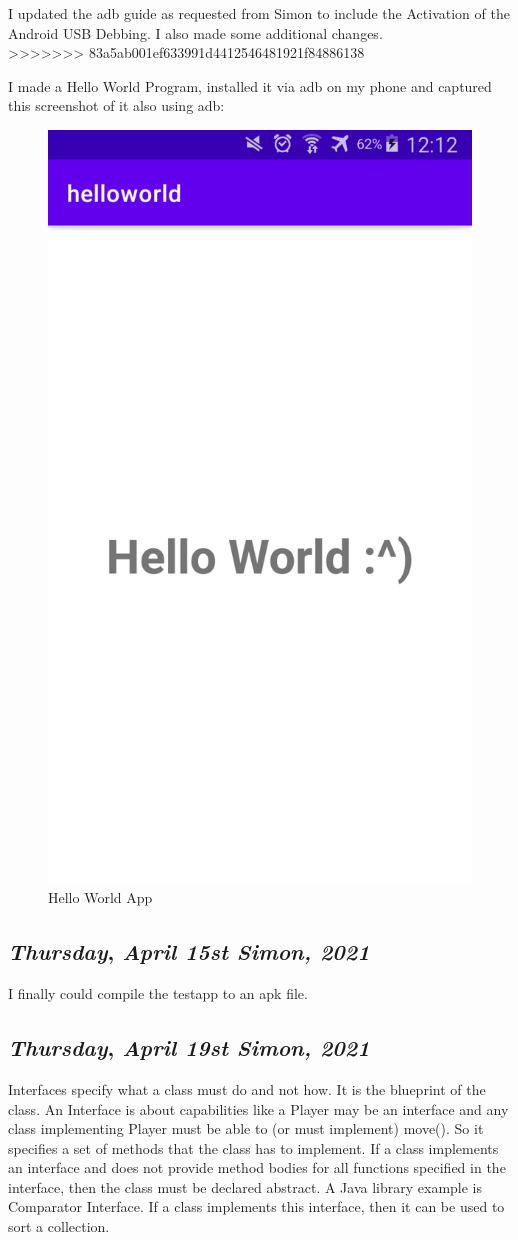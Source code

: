 I updated the adb guide as requested from Simon to include the Activation of the Android USB Debbing. I also made some additional changes.\\
>>>>>>> 83a5ab001ef633991d4412546481921f84886138

I made a Hello World Program, installed it via adb on my phone and captured this screenshot of it also using adb:\\

\begin{figure}[H]
\centering
\includegraphics[width=.4\textwidth]{media/hello-world-app-noah-screenshot}
\caption{Hello World App}
\end{figure}



\def\day{\textit{April 15st Simon, 2021}}
\def\weekday{\textit{Thursday}}
\subsection*{\weekday, \day}

I finally could compile the testapp to an apk file. 

\def\day{\textit{April 19st Simon, 2021}}
\def\weekday{\textit{Thursday}}
\subsection*{\weekday, \day}
Interfaces specify what a class must do and not how. It is the blueprint of the class.
An Interface is about capabilities like a Player may be an interface and any class implementing Player must be able to (or must implement) move(). So it specifies a set of methods that the class has to implement.
If a class implements an interface and does not provide method bodies for all functions specified in the interface, then the class must be declared abstract.
A Java library example is Comparator Interface. If a class implements this interface, then it can be used to sort a collection.

